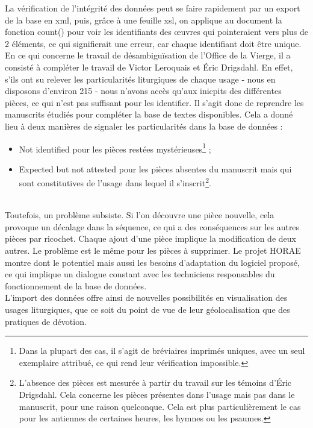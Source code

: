 \documentclass[a4paper,12pt,twoside]{book}
\begin{document}
La vérification de l’intégrité des données peut se faire rapidement par un export de la base en xml, puis, grâce à une feuille xsl, on applique au document la fonction count() pour voir les identifiants des œuvres qui pointeraient vers plus de 2 éléments, ce qui signifierait une erreur, car chaque identifiant doit être unique.\\

En ce qui concerne le travail de désambiguïsation de l'Office de la Vierge, il a consisté à compléter le travail de Victor Leroquais et Éric Drigsdahl. En effet, s'ils ont su relever les particularités liturgiques de chaque usage - nous en disposons d'environ 215 - nous n'avons accès qu'aux inicpits des différentes pièces, ce qui n'est pas suffisant pour les identifier. Il s'agit donc de reprendre les manuscrits étudiés pour compléter la base de textes disponibles. Cela a donné lieu à deux manières de signaler les particularités dans la base de données : 
\begin{itemize}
    \item \og Not identified\fg{} pour les pièces restées mystérieuses\footnote{Dans la plupart des cas, il s'agit de bréviaires imprimés uniques, avec un seul exemplaire attribué, ce qui rend leur vérification impossible.} ;
    \item \og Expected but not attested\fg{} pour les pièces absentes du manuscrit mais qui sont constitutives de l'usage dans lequel il s'inscrit\footnote{L'absence des pièces est mesurée à partir du travail sur les témoins d'Éric Drigsdahl. Cela concerne les pièces présentes dans l'usage mais pas dans le manuscrit, pour une raison quelconque. Cela est plus particulièrement le cas pour les antiennes de certaines heures, les hymnes ou les psaumes.}.
\end{itemize}\\

Toutefois, un problème subsiste. Si l’on découvre une pièce nouvelle, cela provoque un décalage dans la séquence, ce qui a des conséquences sur les autres pièces par ricochet. Chaque ajout d’une pièce implique la modification de deux autres. Le problème est le même pour les pièces à supprimer. Le projet HORAE montre dont le potentiel mais aussi les besoins d’adaptation du logiciel proposé, ce qui implique un dialogue constant avec les techniciens responsables du fonctionnement de la base de données.\\

L'import des données offre ainsi de nouvelles possibilités en visualisation des usages liturgiques, que ce soit du point de vue de leur géolocalisation que des pratiques de dévotion. 
	
\end{document}
